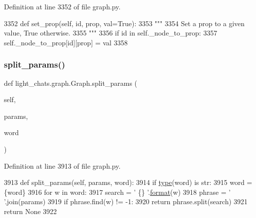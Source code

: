 Definition at line 3352 of file graph.\+py.


\begin{DoxyCode}
3352     \textcolor{keyword}{def }set\_prop(self, id, prop, val=True):
3353         \textcolor{stringliteral}{"""}
3354 \textcolor{stringliteral}{        Set a prop to a given value, True otherwise.}
3355 \textcolor{stringliteral}{        """}
3356         \textcolor{keywordflow}{if} id \textcolor{keywordflow}{in} self.\_node\_to\_prop:
3357             self.\_node\_to\_prop[id][prop] = val
3358 
\end{DoxyCode}
\mbox{\label{classlight__chats_1_1graph_1_1Graph_a3d44dae0701925da960433cb98229c21}} 
\subsubsection{\texorpdfstring{split\+\_\+params()}{split\_params()}}
{\footnotesize\ttfamily def light\+\_\+chats.\+graph.\+Graph.\+split\+\_\+params (\begin{DoxyParamCaption}\item[{}]{self,  }\item[{}]{params,  }\item[{}]{word }\end{DoxyParamCaption})}



Definition at line 3913 of file graph.\+py.


\begin{DoxyCode}
3913     \textcolor{keyword}{def }split\_params(self, params, word):
3914         \textcolor{keywordflow}{if} \hyperlink{namespaceparlai_1_1agents_1_1tfidf__retriever_1_1build__tfidf_ad5dfae268e23f506da084a9efb72f619}{type}(word) \textcolor{keywordflow}{is} str:
3915             word = \{word\}
3916         \textcolor{keywordflow}{for} w \textcolor{keywordflow}{in} word:
3917             search = \textcolor{stringliteral}{' \{\} '}.\hyperlink{namespaceparlai_1_1chat__service_1_1services_1_1messenger_1_1shared__utils_a32e2e2022b824fbaf80c747160b52a76}{format}(w)
3918             phrase = \textcolor{stringliteral}{' '}.join(params)
3919             \textcolor{keywordflow}{if} phrase.find(w) != -1:
3920                 \textcolor{keywordflow}{return} phrase.split(search)
3921         \textcolor{keywordflow}{return} \textcolor{keywordtype}{None}
3922 
\end{DoxyCode}
\mbox{\label{classlight__chats_1_1graph_1_1Graph_a5f54739484e05010202517a4714af30f}} 
